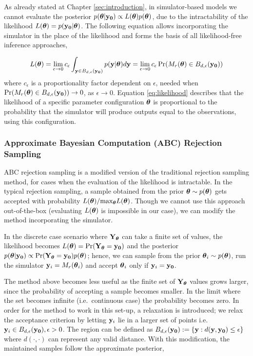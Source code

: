 As already stated at Chapter \ref{sec:introduction}, in
simulator-based models we cannot evaluate the posterior
$p(\boldsymbol{\theta}|\mathbf{y_0}) \propto L(\boldsymbol{\theta})p(\boldsymbol{\theta})$, due to the
intractability of the likelihood $L(\boldsymbol{\theta}) = p(\mathbf{y_0}|\boldsymbol{\theta})$. The
following equation allows incorporating the simulator in the place of
the likelihood and forms the basis of all likelihood-free inference
approaches,

\begin{equation} \label{eq:likelihood}
  L(\boldsymbol{\theta}) =
  \lim_{\epsilon \to 0} c_\epsilon \int_{\mathbf{y} \in B_{d,\epsilon}(\mathbf{y_0})} p(\mathbf{y}|\boldsymbol{\theta})d\mathbf{y} =
  \lim_{\epsilon \to 0} c_\epsilon \Pr(M_r(\boldsymbol{\theta}) \in B_{d,\epsilon}(\mathbf{y_0}))
\end{equation}
%
where $c_\epsilon$ is a proportionality factor dependent on $\epsilon$, needed when
$\Pr(M_r(\boldsymbol{\theta}) \in B_{d, \epsilon}(\mathbf{y_0})) \rightarrow 0$, as $\epsilon \rightarrow 0$. Equation \ref{eq:likelihood} describes that the
likelihood of a specific parameter configuration $\boldsymbol{\theta}$ is
proportional to the probability that the simulator will produce
outputs equal to the observations, using this configuration.

\subsubsection{Approximate Bayesian Computation (ABC) Rejection
  Sampling}

ABC rejection sampling is a modified version of the traditional
rejection sampling method, for cases when the evaluation of the
likelihood is intractable. In the typical rejection sampling, a sample
obtained from the prior $\boldsymbol{\theta} \sim p(\boldsymbol{\theta})$ gets accepted
with probability $L(\boldsymbol{\theta})/ \text{max}_{\boldsymbol{\theta}}
L(\boldsymbol{\theta})$. Though we cannot use this approach out-of-the-box
(evaluating $L(\boldsymbol{\theta})$ is impossible in our case), we can
modify the method incorporating the simulator.

In the discrete case scenario where $\mathbf{Y}_{\boldsymbol{\theta}}$ can take a finite
set of values, the likelihood becomes
$L(\boldsymbol{\theta}) = \Pr(\mathbf{Y}_{\boldsymbol{\theta}} = \mathbf{y_0})$ and the posterior
$p(\boldsymbol{\theta}|\mathbf{y_0}) \propto \Pr(\mathbf{Y}_{\boldsymbol{\theta}}=\mathbf{y_0})p(\boldsymbol{\theta})$; hence, we can
sample from the prior $\boldsymbol{\theta}_i \sim p(\boldsymbol{\theta})$, run the simulator
$\mathbf{y}_i = M_r(\boldsymbol{\theta}_i)$ and accept $\boldsymbol{\theta}_i$ only if
$\mathbf{y}_i = \mathbf{y_0}$.

The method above becomes less useful as the finite set of
$\mathbf{Y}_{\boldsymbol{\theta}}$ values grows larger, since the probability of
accepting a sample becomes smaller. In the limit
where the set becomes infinite (i.e.\ continuous case) the probability
becomes zero. In order for the method to work in this set-up, a
relaxation is introduced; we relax the acceptance criterion by letting
$\mathbf{y}_{i}$ lie in a larger set of points i.e.\
$\mathbf{y}_{i} \in B_{d,\epsilon}(\mathbf{y_0}), \epsilon > 0$. The region can be
defined as $B_{d,\epsilon} (\mathbf{y_0}) := \{\mathbf{y}: d(\mathbf{y}, \mathbf{y_0}) \leq \epsilon \}$
where $d(\cdot, \cdot)$ can represent any valid distance. With this
modification, the maintained samples follow the approximate posterior,

